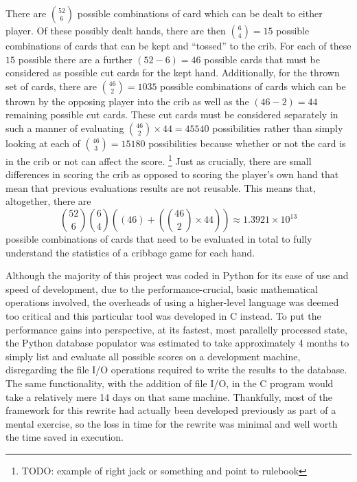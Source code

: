 There are ${52 \choose 6}$ possible combinations of card which can be dealt to
either player.
%
Of these possibly dealt hands, there are then ${6 \choose 4} = 15$ possible
combinations of cards that can be kept and ``tossed'' to the crib.
%
For each of these $15$ possible there are a further $(52-6)=46$ possible cards
that must be considered as possible cut cards for the kept hand.
%
Additionally, for the thrown set of cards,
there are ${46 \choose 2} = 1035$ possible combinations of cards which can be
thrown by the opposing player into the crib as well as the
$(46-2)=44$ remaining possible cut cards.
%
These cut cards must be considered separately in such a manner of
evaluating ${46 \choose 2} \times 44 = 45540$ possibilities rather than
simply looking at each of ${46 \choose 3} = 15180$ possibilities because
whether or not the card is in the crib or not can affect the score.%
\footnote{TODO: example of right jack or something and point to rulebook}
%
Just as crucially, there are small differences in scoring the crib as opposed to
scoring the player's own hand that mean that previous evaluations results are
not reusable.
%
This means that, altogether, there are 
\[
	{52 \choose 6}
	{6 \choose 4}
	\left(
		\left(46\right) +
		\left(
			{46 \choose 2} \times 44
		\right)
	\right)
	\approx
	1.3921 \times {10}^{13}
\]
possible combinations of cards that need to be evaluated in total to fully 
understand the statistics
of a cribbage game for each hand.

Although the majority of this project was coded in Python for its ease of use
and speed of development,
due to the performance-crucial, basic mathematical operations involved,
the overheads of using a higher-level language was deemed too critical and
this particular tool was developed in C instead.
%
To put the performance gains into perspective,
at its fastest, most parallelly processed state,
the Python database populator was estimated to take approximately 4 months to
simply list and evaluate all possible scores on a development machine,
disregarding the file I/O operations required to write the results to the
database.
%
The same functionality, with the addition of file I/O,
in the C program would take a relatively mere 14 days
on that same machine.
%
Thankfully, most of the framework for this rewrite had actually been developed
previously as part of a mental exercise, so the loss in time for the rewrite was
minimal and well worth the time saved in execution.


